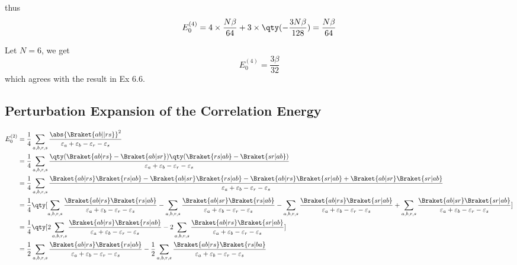 \documentclass[a4paper]{article}
\begin{document}
thus
\begin{equation}\label{key}
E_0^{(4)} = 4\times \dfrac{N\beta}{64} + 3\times\qty(-\dfrac{3N\beta}{128}) =  \dfrac{N\beta}{64}
\end{equation}

Let $ N=6 $, we get
\begin{equation}\label{key}
E_0^{(4)} = \dfrac{3\beta}{32}
\end{equation}
which agrees with the result in Ex 6.6.

\subsection{Perturbation Expansion of the Correlation Energy}
\begin{align}
E_0^{(2)} &= 
\dfrac{1}{4}\sum_{a,b,r,s} \dfrac{\abs{\Braket{ab||rs}}^2}{\varepsilon_a + \varepsilon_b - \varepsilon_r - \varepsilon_s} \notag\\
&= \dfrac{1}{4}\sum_{a,b,r,s} 
\dfrac{\qty(\Braket{ab|rs} - \Braket{ab|sr}) \qty(\Braket{rs|ab} - \Braket{sr|ab})}{\varepsilon_a + \varepsilon_b - \varepsilon_r - \varepsilon_s} \notag\\
&= \dfrac{1}{4}\sum_{a,b,r,s} 
\dfrac{\Braket{ab|rs}\Braket{rs|ab} - \Braket{ab|sr}\Braket{rs|ab}  - \Braket{ab|rs}\Braket{sr|ab} + \Braket{ab|sr}\Braket{sr|ab}}{\varepsilon_a + \varepsilon_b - \varepsilon_r - \varepsilon_s} \notag\\
&= \dfrac{1}{4}\qty[\sum_{a,b,r,s} 
\dfrac{\Braket{ab|rs}\Braket{rs|ab}}{\varepsilon_a + \varepsilon_b - \varepsilon_r - \varepsilon_s}
- \sum_{a,b,r,s} 
\dfrac{\Braket{ab|sr}\Braket{rs|ab}}{\varepsilon_a + \varepsilon_b - \varepsilon_r - \varepsilon_s}
- \sum_{a,b,r,s} 
\dfrac{ \Braket{ab|rs}\Braket{sr|ab}}{\varepsilon_a + \varepsilon_b - \varepsilon_r - \varepsilon_s}
+ \sum_{a,b,r,s} 
\dfrac{\Braket{ab|sr}\Braket{sr|ab}}{\varepsilon_a + \varepsilon_b - \varepsilon_r - \varepsilon_s}
] \notag\\
&= \dfrac{1}{4}\qty[2\sum_{a,b,r,s} 
\dfrac{\Braket{ab|rs}\Braket{rs|ab}}{\varepsilon_a + \varepsilon_b - \varepsilon_r - \varepsilon_s}
- 2\sum_{a,b,r,s} 
\dfrac{\Braket{ab|rs}\Braket{sr|ab}}{\varepsilon_a + \varepsilon_b - \varepsilon_r - \varepsilon_s}
] \notag\\
&= \dfrac{1}{2}\sum_{a,b,r,s} 
\dfrac{\Braket{ab|rs}\Braket{rs|ab}}{\varepsilon_a + \varepsilon_b - \varepsilon_r - \varepsilon_s}
- \dfrac{1}{2}\sum_{a,b,r,s} 
\dfrac{\Braket{ab|rs}\Braket{rs|ba}}{\varepsilon_a + \varepsilon_b - \varepsilon_r - \varepsilon_s}
\end{align}
\end{document}
